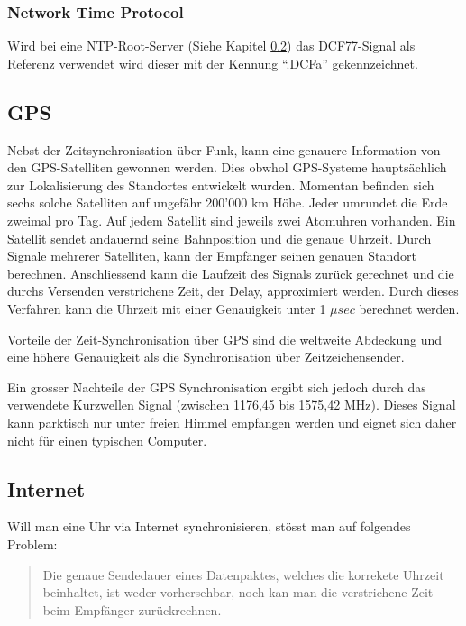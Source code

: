 \subsubsection{Network Time Protocol}
Wird bei eine NTP-Root-Server (Siehe Kapitel \ref{Anaylse:Internet}) das DCF77-Signal als Referenz verwendet wird dieser mit der Kennung "`.DCFa"' gekennzeichnet.

\subsection{GPS}
Nebst der Zeitsynchronisation über Funk, kann eine genauere Information von den GPS-Satelliten gewonnen werden. Dies obwhol GPS-Systeme hauptsächlich zur Lokalisierung des Standortes entwickelt wurden.
Momentan befinden sich sechs solche Satelliten auf ungefähr 200'000 km Höhe. Jeder umrundet die Erde zweimal pro Tag. Auf jedem Satellit sind jeweils zwei Atomuhren vorhanden.
Ein Satellit sendet andauernd seine Bahnposition und die genaue Uhrzeit. Durch Signale mehrerer Satelliten, kann der Empfänger seinen genauen Standort berechnen.
Anschliessend kann die Laufzeit des Signals zurück gerechnet und die durchs Versenden verstrichene Zeit, der Delay, approximiert werden.
Durch dieses Verfahren kann die Uhrzeit mit einer Genauigkeit unter 1 ${\mu}sec$ berechnet werden.

Vorteile der Zeit-Synchronisation über GPS sind die weltweite Abdeckung und eine höhere Genauigkeit als die Synchronisation über Zeitzeichensender.

Ein grosser Nachteile der GPS Synchronisation ergibt sich jedoch durch das verwendete Kurzwellen Signal (zwischen 1176,45 bis 1575,42 MHz). Dieses Signal kann parktisch nur unter freien Himmel empfangen werden und eignet sich daher nicht für einen typischen Computer.

\subsection{Internet} \label{Anaylse:Internet}

Will man eine Uhr via Internet synchronisieren, stösst man auf folgendes Problem:

\begin{verse}
Die genaue Sendedauer eines  Datenpaktes, welches die korrekete Uhrzeit beinhaltet, ist weder vorhersehbar, noch kan man die verstrichene Zeit beim Empfänger zurückrechnen.
\end{verse}

